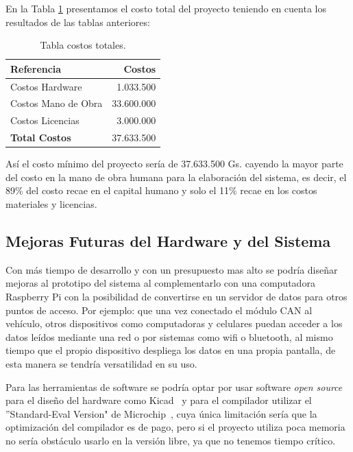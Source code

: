 En la Tabla \ref{tabla:total} presentamos el costo total del proyecto teniendo en cuenta los resultados de las tablas anteriores: 

\begin{table}[H]
\begin{center}
\begin{tabular}{l r}
\toprule
\textbf{Referencia} & \textbf{Costos}  \\ 
\midrule
Costos Hardware  & 1.033.500\\ 
Costos Mano de Obra  & 33.600.000     \\ 
Costos Licencias & 3.000.000\\ 
\textbf{Total Costos} & 37.633.500    \\ 
\bottomrule
\end{tabular}
\caption{Tabla costos totales.}
\label{tabla:total}
\end{center}
\end{table}

Así el costo mínimo del proyecto sería de 37.633.500 Gs. cayendo la mayor parte del costo en la mano de obra humana para la elaboración del sistema, es decir, el 89\% del costo recae en el capital humano y solo el 11\% recae en los costos materiales y licencias. 

\subsection{Mejoras Futuras del Hardware y del Sistema}

Con más tiempo de desarrollo y con un presupuesto mas alto se podría diseñar mejoras al prototipo del sistema al complementarlo con una computadora Raspberry Pi con la posibilidad de convertirse en un servidor de datos para otros puntos de acceso.
Por ejemplo: que una vez conectado el módulo CAN al vehículo, otros dispositivos como computadoras y celulares puedan acceder a los datos leídos mediante una red o por sistemas como wifi o bluetooth, al mismo tiempo que el propio dispositivo despliega los datos en una propia pantalla, de esta manera se tendría versatilidad en su uso.

Para las herramientas de software se podría optar por usar software \textit{open source} para el diseño del hardware como Kicad~\cite{kitcad} y para el compilador utilizar el ''Standard-Eval Version" de Microchip~\cite{compmicro}, cuya única limitación sería que la optimización del compilador es de pago, pero si el proyecto utiliza poca memoria no sería obstáculo usarlo en la versión libre, ya que no tenemos tiempo crítico. 


